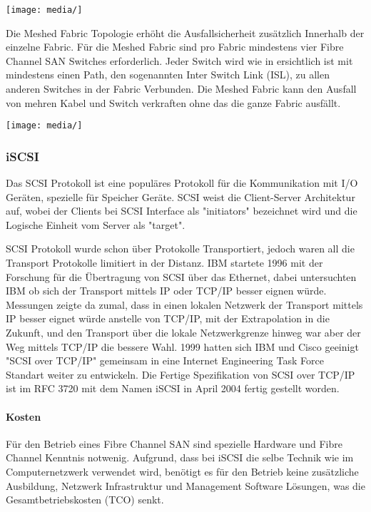 \begin{center}
\texttt{[image: media/]}
\end{center}

Die Meshed Fabric Topologie erhöht die Ausfallsicherheit zusätzlich Innerhalb der einzelne Fabric. Für die Meshed Fabric sind pro Fabric mindestens vier Fibre Channel SAN Switches erforderlich. Jeder Switch wird wie in  ersichtlich ist mit mindestens einen Path, den sogenannten Inter Switch Link (ISL), zu allen anderen Switches in der Fabric Verbunden. Die Meshed Fabric kann den Ausfall von mehren Kabel und Switch verkraften ohne das die ganze Fabric ausfällt.\cite{Christopher2009}

\begin{center}
\texttt{[image: media/]}
\end{center}

\subsubsection{iSCSI}
Das SCSI Protokoll ist eine populäres Protokoll für die Kommunikation mit I/O Geräten, spezielle für Speicher Geräte. SCSI weist die Client-Server Architektur auf, wobei der Clients bei SCSI Interface als "initiators" bezeichnet wird und die Logische Einheit vom Server als "target".

SCSI Protokoll wurde schon über Protokolle Transportiert, jedoch waren all die Transport Protokolle limitiert in der Distanz. IBM startete 1996 mit der Forschung für die Übertragung von SCSI über das Ethernet, dabei untersuchten IBM ob sich der Transport mittels IP oder TCP/IP besser eignen würde. Messungen zeigte da zumal, dass in einen lokalen Netzwerk der Transport mittels IP besser eignet würde anstelle von TCP/IP, mit der Extrapolation in die Zukunft, und den Transport über die lokale Netzwerkgrenze hinweg war aber der Weg mittels TCP/IP die bessere Wahl. 1999 hatten sich IBM und Cisco geeinigt "SCSI over TCP/IP" gemeinsam in eine Internet Engineering Task Force  Standart weiter zu entwickeln. \cite{JohnL.202} Die Fertige Spezifikation von SCSI over TCP/IP ist im RFC 3720 mit dem Namen iSCSI in April 2004 fertig gestellt worden.\cite{J.Satran2004}

\paragraph*{Kosten}
Für den Betrieb eines Fibre Channel SAN sind spezielle Hardware und Fibre Channel Kenntnis notwenig. Aufgrund, dass bei iSCSI die selbe Technik wie im Computernetzwerk verwendet wird, benötigt es für den Betrieb keine zusätzliche Ausbildung, Netzwerk Infrastruktur und Management Software Lösungen, was die Gesamtbetriebskosten (TCO) senkt.

